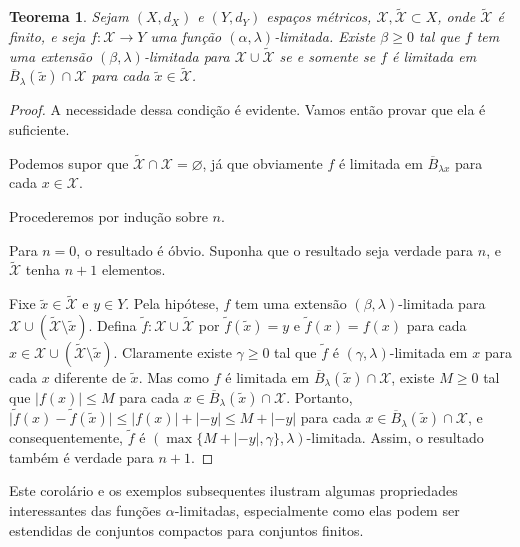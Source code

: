 \documentclass[a4paper,12pt]{article}
\newtheorem{theorem}{Teorema}
\theoremstyle{definition}
\begin{document}


\begin{theorem} \label{tietze} Sejam $(X,d_X)$ e $(Y, d_Y)$ espaços métricos, $\mathcal{X}, \tilde{\mathcal{X}} \subset X$, onde $\tilde{\mathcal{X}}$ é finito, e seja $f : \mathcal{X} \to Y$ uma função $(\alpha,\lambda)$-limitada. Existe $\beta \ge 0$ tal que $f$ tem uma extensão $(\beta,\lambda)$-limitada para $\mathcal{X} \cup \tilde{\mathcal{X}}$ se e somente se $f$ é limitada em $\overline{B}_{\lambda}(\tilde{x}) \cap \mathcal{X}$ para cada $\tilde{x} \in \tilde{\mathcal{X}}$. \end{theorem}

\begin{proof} A necessidade dessa condição é evidente. Vamos então provar que ela é suficiente.

  Podemos supor que $\tilde{\mathcal{X}} \cap \mathcal{X} = \varnothing$, já que obviamente $f$ é limitada em $\overline{B}_{\lambda x}$ para cada $x \in \mathcal{X}$.

  Procederemos por indução sobre $n$.

  Para $n = 0$, o resultado é óbvio. Suponha que o resultado seja verdade para $n$, e $\tilde{\mathcal{X}}$ tenha $n+1$ elementos.

  Fixe $\tilde{x} \in \tilde{\mathcal{X}}$ e $y \in Y$. Pela hipótese, $f$ tem uma extensão $(\beta,\lambda)$-limitada para $\mathcal{X} \cup (\tilde{\mathcal{X}} \setminus {\tilde{x}})$. Defina $\tilde{f} : \mathcal{X} \cup \tilde{\mathcal{X}}$ por $\tilde{f}(\tilde{x}) = y$ e $\tilde{f}(x) = f(x)$ para cada $x \in \mathcal{X} \cup (\tilde{\mathcal{X}} \setminus {\tilde{x}})$. Claramente existe $\gamma \ge 0$ tal que $\tilde{f}$ é $(\gamma,\lambda)$-limitada em $x$ para cada $x$ diferente de $\tilde{x}$. Mas como $f$ é limitada em $\overline{B}_{\lambda}(\tilde{x}) \cap \mathcal{X}$, existe $M \ge 0$ tal que $\lvert f(x) \rvert \le M$ para cada $x \in \overline{B}_{\lambda}(\tilde{x}) \cap \mathcal{X}$. Portanto, $\lvert \tilde{f}(x)-\tilde{f}(\tilde{x})\rvert \le \lvert f(x)\rvert + \lvert -y\rvert \le M + \lvert-y\rvert$ para cada $x \in \overline{B}_{\lambda}(\tilde{x}) \cap \mathcal{X}$, e consequentemente, $\tilde{f}$ é $(\max\{M + \lvert-y\rvert, \gamma\},\lambda)$-limitada. Assim, o resultado também é verdade para $n+1$. \end{proof}

Este corolário e os exemplos subsequentes ilustram algumas propriedades interessantes das funções $\alpha$-limitadas, especialmente como elas podem ser estendidas de conjuntos compactos para conjuntos finitos.
\end{document}
